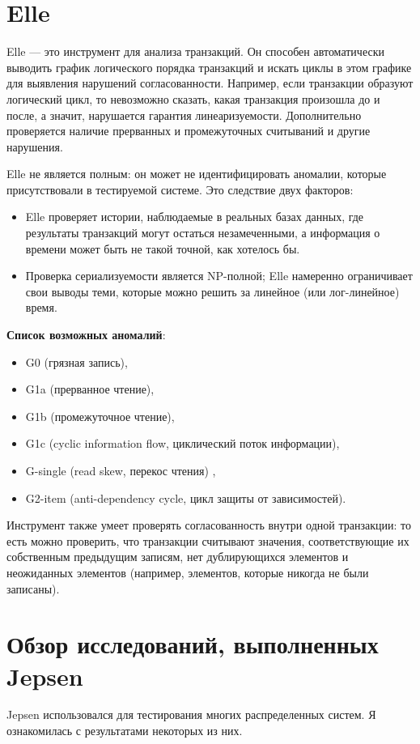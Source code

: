 \documentclass[12pt,  openany]{book}
\begin{document}
\section{Elle}
\par
Elle --- это инструмент для анализа транзакций. Он способен автоматически выводить график логического порядка транзакций и искать циклы в этом графике для выявления нарушений согласованности. Например, если транзакции образуют логический цикл, то невозможно сказать, какая транзакция произошла до и после, а значит, нарушается гарантия линеаризуемости. 
Дополнительно проверяется наличие прерванных и промежуточных считываний и другие нарушения.
\par
Elle не является полным: он может не идентифицировать аномалии, которые присутствовали в тестируемой системе. Это следствие двух факторов:
\begin{itemize}
\item Elle проверяет истории, наблюдаемые в реальных базах данных, где результаты транзакций могут остаться незамеченными, а информация о времени может быть не такой точной, как хотелось бы.
\item Проверка сериализуемости является NP-полной; Elle намеренно ограничивает свои выводы теми, которые можно решить за линейное (или лог-линейное) время.
\end{itemize}
\par
\textbf{Список возможных аномалий}:
\begin{itemize}
\item G0 (грязная запись), 
\item G1a (прерванное чтение), 
\item G1b (промежуточное чтение), 
\item G1c (cyclic information flow, циклический поток информации), 
\item G-single (read skew, перекос чтения) ,
\item G2-item (anti-dependency cycle, цикл защиты от зависимостей).
\end{itemize}
Инструмент также умеет проверять согласованность внутри одной транзакции: то есть можно проверить, что транзакции считывают значения, соответствующие их собственным предыдущим записям, нет дублирующихся элементов и неожиданных элементов (например, элементов, которые никогда не были записаны).
\section{Обзор исследований, выполненных Jepsen}
Jepsen использовался для тестирования многих распределенных систем. 
Я ознакомилась с результатами некоторых из них.
\end{document}
